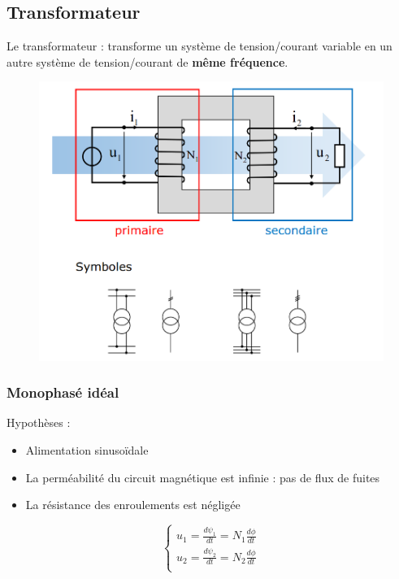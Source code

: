 \documentclass[../main.tex]{subfiles}
\begin{document}
\subsection{Transformateur}
Le transformateur : transforme un système de tension/courant variable en un autre système de tension/courant de \textbf{même fréquence}.\\

\begin{figure}[hbt!]
    \centering
    \includegraphics[width = \textwidth]{IMAGES/machineelec/transfo.png}
\end{figure}

\subsubsection{Monophasé idéal}
Hypothèses : \begin{itemize}
    \item Alimentation sinusoïdale\\
    \item La perméabilité du circuit magnétique est infinie : pas de flux de fuites\\
    \item La résistance des enroulements est négligée\\
\end{itemize}

\begin{equation}
    \begin{cases}
        u_1 = \frac{d\psi_1}{dt} = N_1 \frac{d\phi}{dt}\\
        u_2 = \frac{d\psi_2}{dt} = N_2 \frac{d\phi}{dt}\\
    \end{cases}
\end{equation}
\end{document}
